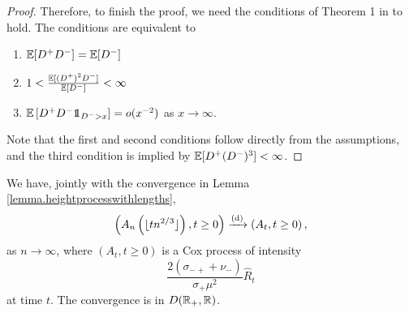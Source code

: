\begin{proof}
Therefore, to finish the proof, we need the conditions of Theorem 1 in \cite{deraphelisScalingLimitMultitype2017} to hold. The conditions are equivalent to 
\begin{enumerate}
    \item ${\mathbb E}[D^+D^-]={\mathbb E}[D^-]$
    \item $1<\frac{{\mathbb E}[(D^+)^2D^-]}{{\mathbb E}[D^-]}<\infty$
    \item $\E\left[D^+D^-\one_{D^->x}\right]=o(x^{-2})$ as $x\to \infty$. 
\end{enumerate}
Note that the first and second conditions follow directly from the assumptions, and the third condition is implied by ${\mathbb E}[D^+(D^-)^3]<\infty$.
\end{proof}



\begin{proposition}\label{prop.convergenceancestraledges}
We have, jointly with the convergence in Lemma \ref{lemma.heightprocesswithlengths},
\begin{align*}\left(A_n\left(\lfloor tn^{2/3}\rfloor\right),t\geq 0\right)\xrightarrow[]{\mathrm{(d)}}\left(A_t,t\geq 0\right),\end{align*}
as $n\to \infty$, where $(A_t,t\geq 0)$ is a Cox process of intensity $$\frac{2(\sigma_{-+}+\nu_-)}{\sigma_+\mu^2} \hat{R}_t$$ at time $t$. The convergence is in $D({\mathbb R}_+,{\mathbb R})$.
\end{proposition}


